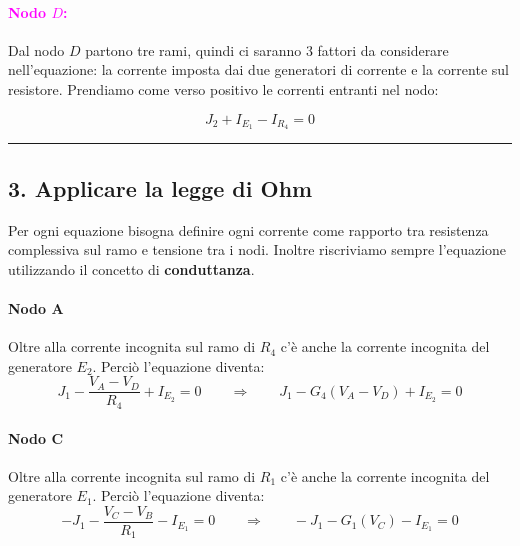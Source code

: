 \paragraph{\textcolor{magenta}{\textbf{Nodo $D$:}}}
\begin{minipage}[t]{0.6\textwidth}
\vspace{0pt}
Dal nodo $D$ partono tre rami, quindi ci saranno 3 fattori da considerare nell'equazione: la corrente imposta dai due generatori di corrente e la corrente sul resistore. Prendiamo come verso positivo le correnti entranti nel nodo:

\begin{equation}
        J_2 + I_{E_1} - I_{R_4} = 0
        \label{eq:nodoD_vincolo}
\end{equation}
\end{minipage}
\hfill
\begin{minipage}[t]{0.3\textwidth}
\vspace{0pt}
\centering
{}
\end{minipage}


\vspace*{0.3cm}
\hrule

\subsection*{3. Applicare la legge di Ohm}
Per ogni equazione bisogna definire ogni corrente come rapporto tra resistenza complessiva sul ramo e tensione tra i nodi. Inoltre riscriviamo sempre l'equazione utilizzando il concetto di \textbf{conduttanza}.

\paragraph{Nodo A}
Oltre alla corrente incognita sul ramo di $R_4$ c'è anche la corrente incognita del generatore $E_2$. Perciò l'equazione diventa:
\begin{equation}
J_1 - \frac{V_A - V_D}{R_4} + I_{E_2}= 0 \qquad \Rightarrow \qquad J_1 - G_4\left(V_A - V_D\right) + I_{E_2}= 0
\label{eq:nodoA_Ohm_E}
\end{equation}

\paragraph{Nodo C}
Oltre alla corrente incognita sul ramo di $R_1$ c'è anche la corrente incognita del generatore $E_1$. Perciò l'equazione diventa:
\begin{equation}
- J_1 - \frac{V_C - V_B}{R_1} - I_{E_1} = 0 \qquad \Rightarrow \qquad - J_1 - G_1\left(V_C\right) - I_{E_1}= 0
\label{eq:nodoC_Ohm_E}
\end{equation}


